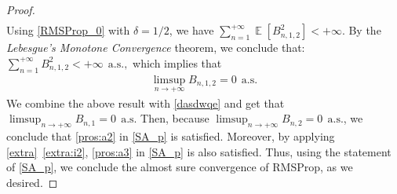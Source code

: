 \documentclass[standalone]{article}
\DeclareMathOperator{\Expect}{\mathbb{E}}
\newtheorem{lemma}{Lemma}[section]
\begin{document}
\begin{proof}
\begin{align*}
\end{align*}
Using \cref{RMSProp_0} with \(\delta = 1/2\), we have  $ \sum_{n=1}^{+\infty}\Expect[B_{n,1,2}^{2}]<+\infty. $
By the \emph{Lebesgue's Monotone Convergence} theorem, we conclude that:
$\sum_{n=1}^{+\infty}B_{n,1,2}^{2}<+\infty\ \ \text{a.s.},
$ which implies that
\begin{align*}
\limsup_{n\rightarrow+\infty}B_{n,1,2}=0\ \ \text{a.s.}
\end{align*}
We combine the above result with \cref{dasdwqe} and get that
$\limsup_{n\rightarrow+\infty}B_{n,1}=0\ \ \text{a.s.} $ Then, because $\limsup_{n\rightarrow+\infty}B_{n,2}=0\ \ \text{a.s.} $, we conclude that \cref{pros:a2} in \cref{SA_p} is satisfied. Moreover, by applying \cref{extra}~\ref{extra:i2},  \cref{pros:a3} in \cref{SA_p} is also satisfied. Thus, using the statement of \cref{SA_p}, we conclude the almost sure convergence of RMSProp, as we desired.  
\end{proof}


\end{document}
